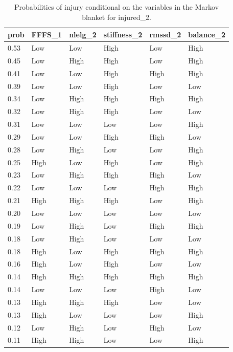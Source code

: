\documentclass[man,floatsintext]{apa6}
\begin{document}
\begin{table}[H]

\begin{center}
\begin{threeparttable}

\caption{\label{tab:unnamed-chunk-9}Probabilities of injury conditional on the variables in the Markov blanket for injured\_2.}

\begin{tabular}{llllll}
\toprule
prob & \multicolumn{1}{c}{FFFS\_1} & \multicolumn{1}{c}{nlelg\_2} & \multicolumn{1}{c}{stiffness\_2} & \multicolumn{1}{c}{rmssd\_2} & \multicolumn{1}{c}{balance\_2}\\
\midrule
0.53 & Low & Low & High & Low & High\\
0.45 & Low & High & High & Low & High\\
0.41 & Low & Low & High & High & High\\
0.39 & Low & Low & High & Low & Low\\
0.34 & Low & High & High & High & High\\
0.32 & Low & High & High & Low & Low\\
0.31 & Low & Low & Low & Low & High\\
0.29 & Low & Low & High & High & Low\\
0.28 & Low & High & Low & Low & High\\
0.25 & High & Low & High & Low & High\\
0.23 & Low & High & High & High & Low\\
0.22 & Low & Low & Low & High & High\\
0.21 & High & High & High & Low & High\\
0.20 & Low & Low & Low & Low & Low\\
0.19 & Low & High & Low & High & High\\
0.18 & Low & High & Low & Low & Low\\
0.18 & High & Low & High & High & High\\
0.16 & High & Low & High & Low & Low\\
0.14 & High & High & High & High & High\\
0.14 & Low & Low & Low & High & Low\\
0.13 & High & High & High & Low & Low\\
0.13 & High & Low & Low & Low & High\\
0.12 & Low & High & Low & High & Low\\
0.11 & High & High & Low & Low & High\\

\end{tabular}
\end{threeparttable}
\end{center}
\end{table}
\end{document}
